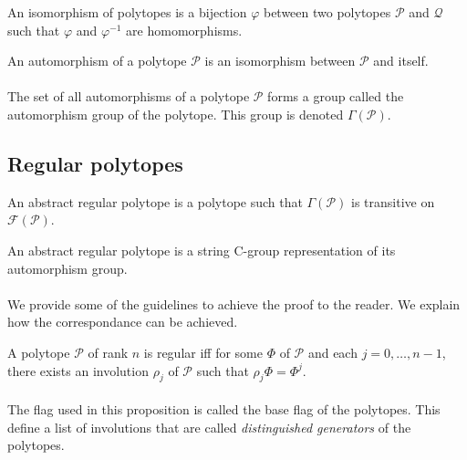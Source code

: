 \begin{definition}
  An isomorphism of polytopes is a bijection $\varphi$ between two polytopes $\mathcal P$ and $\mathcal Q$ such that $\varphi$ and $\varphi^{-1}$ are homomorphisms.
\end{definition}

\begin{definition}
  An automorphism of a polytope $\mathcal P$ is an isomorphism between $\mathcal P$ and itself.
\end{definition}

\paragraph{}
The set of all automorphisms of a polytope $\mathcal P$ forms a group called the automorphism group of the polytope. This group is denoted $\Gamma(\mathcal P)$.

\subsection{Regular polytopes}

\begin{definition}
  An abstract regular polytope is a polytope such that $\Gamma(\mathcal P)$ is transitive on $\mathcal F(\mathcal P)$.
\end{definition}

\begin{theorem}
  An abstract regular polytope is a string C-group representation of its automorphism group.
\end{theorem}

\paragraph{}
We provide some of the guidelines to achieve the proof to the reader. We explain how the correspondance can be achieved.

\begin{proposition}
  A polytope $\mathcal P$ of rank $n$ is regular iff for some $\Phi$ of $\mathcal P$ and each $j = 0, \dots, n-1$, there exists an involution $\rho_j$ of $\mathcal P$ such that $\rho_j \Phi = \Phi^j$.
\end{proposition}

\paragraph{}
The flag used in this proposition is called the base flag of the polytopes. This define a list of involutions that are called \textit{distinguished generators} of the polytopes.

